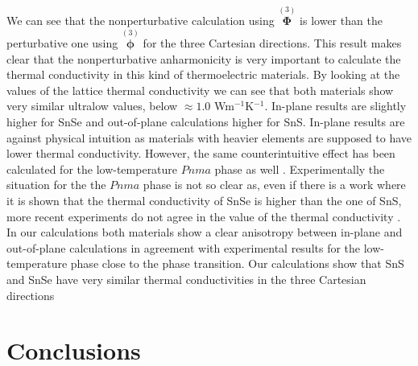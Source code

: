 We can see that the nonperturbative calculation using $\overset{(3)}{\boldsymbol{\Phi}}$ is lower than the perturbative one using $\overset{(3)}{\boldsymbol{\phi}}$ for the three Cartesian directions. This result makes clear that
the nonperturbative anharmonicity is very important to calculate the thermal conductivity in this kind of thermoelectric materials. By looking at the values of the lattice thermal conductivity we can see that both materials show
very similar ultralow values, below $\approx 1.0$ Wm$^{-1}$K$^{-1}$. In-plane results are slightly higher for SnSe and out-of-plane calculations higher for SnS.
In-plane results are against physical intuition as materials with heavier elements are supposed to have lower thermal conductivity. However, the same counterintuitive effect has been calculated for the low-temperature $Pnma$ phase 
as well \cite{skelton2017lattice,guo2015first}.
Experimentally the situation for the the $Pnma$ phase is not so clear as, even if there is a work \cite{wasscher1963simple} where it is shown that the thermal conductivity of SnSe is higher than the one of SnS, more recent experiments do not agree in the value of the thermal conductivity  \cite{he2018remarkable,tan2014thermoelectrics}.
In our calculations both materials show a clear anisotropy between in-plane and out-of-plane calculations in agreement
with experimental results\cite{ibrahim2017reinvestigation} for the low-temperature phase close to the phase transition. Our calculations show that SnS and SnSe have very similar thermal conductivities in the three Cartesian
directions

\section{Conclusions}

